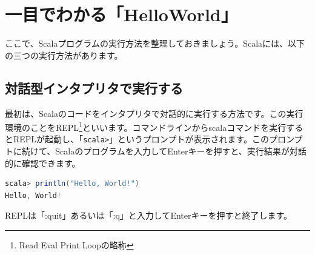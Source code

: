 \begin{table}[htb]
  \caption{EclipseユーザーのためのIntelliJ IDEAショートカット一覧}
  \label{tb:intellij_shortcuts}
  \begin{center}
  \end{center}
  \label{tb:table1}
\end{table}


\section{一目でわかる「HelloWorld」}
ここで、Scalaプログラムの実行方法を整理しておきましょう。Scalaには、以下の三つの実行方法があります。

\subsection{対話型インタプリタで実行する}
最初は、Scalaのコードをインタプリタで対話的に実行する方法です。この実行環境のことをREPL\footnote{Read Eval Print Loopの略称}といいます。コマンドラインからscalaコマンドを実行するとREPLが起動し、「\verb|scala>|」というプロンプトが表示されます。このプロンプトに続けて、Scalaのプログラムを入力してEnterキーを押すと、実行結果が対話的に確認できます。
\begin{lstlisting}[language=scala, frame=none]
scala> println("Hello, World!")
Hello, World!
\end{lstlisting}
REPLは「:quit」あるいは「:q」と入力してEnterキーを押すと終了します。 \\

